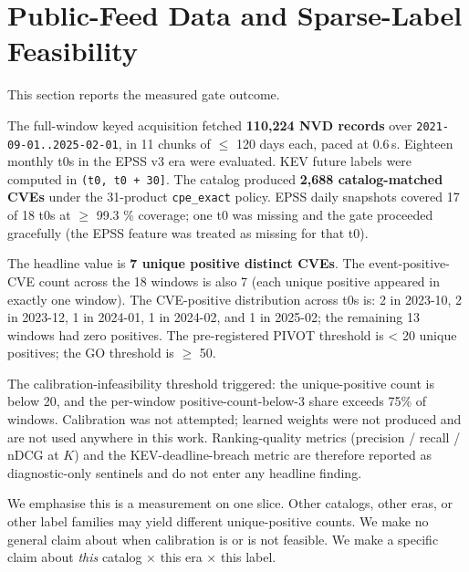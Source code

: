 \section{Public-Feed Data and Sparse-Label Feasibility}
This section reports the measured gate outcome.

The full-window keyed acquisition fetched \textbf{110,224 NVD records} over \texttt{2021-09-01..2025-02-01}, in 11 chunks of $\leq$ 120 days each, paced at 0.6\,s. Eighteen monthly t0s in the EPSS v3 era were evaluated. KEV future labels were computed in \texttt{(t0, t0 + 30]}. The catalog produced \textbf{2,688 catalog-matched CVEs} under the 31-product \texttt{cpe\_exact} policy. EPSS daily snapshots covered 17 of 18 t0s at $\geq$ 99.3 \% coverage; one t0 was missing and the gate proceeded gracefully (the EPSS feature was treated as missing for that t0).

The headline value is \textbf{7 unique positive distinct CVEs}. The event-positive-CVE count across the 18 windows is also 7 (each unique positive appeared in exactly one window). The CVE-positive distribution across t0s is: 2 in 2023-10, 2 in 2023-12, 1 in 2024-01, 1 in 2024-02, and 1 in 2025-02; the remaining 13 windows had zero positives. The pre-registered PIVOT threshold is < 20 unique positives; the GO threshold is $\geq$ 50.

The calibration-infeasibility threshold triggered: the unique-positive count is below 20, and the per-window positive-count-below-3 share exceeds 75\% of windows. Calibration was not attempted; learned weights were not produced and are not used anywhere in this work. Ranking-quality metrics (precision / recall / nDCG at $K$) and the KEV-deadline-breach metric are therefore reported as diagnostic-only sentinels and do not enter any headline finding.

We emphasise this is a measurement on one slice. Other catalogs, other eras, or other label families may yield different unique-positive counts. We make no general claim about when calibration is or is not feasible. We make a specific claim about \emph{this} catalog × this era × this label.
